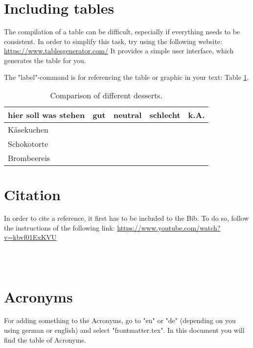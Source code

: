 \section{Including tables}

The compilation of a table can be difficult, especially if everything needs to be consistent. In order to simplify this task, try using the following website: \url{https://www.tablesgenerator.com/}
It provides a simple user interface, which generates the table for you.

The "label"-command is for referencing the table or graphic in your text: Table \ref{desserts}.

\begin{table}[H]
    \caption{Comparison of different desserts.}
    \label{desserts}
    \centering
    \begin{tabular}{@{}lllll@{}}
        \toprule
        hier soll was stehen & gut & neutral & schlecht & k.A. \\ \midrule
        Käsekuchen           &     &         &          &      \\
        Schokotorte          &     &         &          &      \\
        Brombeereis          &     &         &          &      \\ \bottomrule
    \end{tabular}
\end{table}



\section{Citation}

In order to cite a reference, it first has to be included to the Bib. To do so, follow the instructions of the following link: \url{https://www.youtube.com/watch?v=kbvf01ExKVU}

\cite[based on][p. 80]{HEVN04}
\\\cite[80]{HEVN04}
\\\cite{LAMP86}

\section{Acronyms}

For adding something to the Acronyms, go to "en" or "de" (depending on you using german or english) and select "frontmatter.tex". In this document you will find the table of Acronyms.
